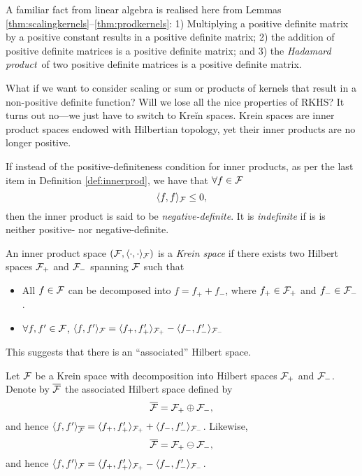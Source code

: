 A familiar fact from linear algebra is realised here from Lemmas \ref{thm:scalingkernels}--\ref{thm:prodkernels}: 
1) Multiplying a positive definite matrix by a positive constant results in a positive definite matrix; 
2) the addition of positive definite matrices is a positive definite matrix; and 
3) the \emph{Hadamard product}\footnotemark~of two positive definite matrices is a positive definite matrix.


What if we want to consider scaling or sum or products of kernels that result in a non-positive definite function?
Will we lose all the nice properties of RKHS?
It turns out no---we just have to switch to Kreĭn spaces.
Krein spaces are inner product spaces endowed with Hilbertian topology, yet their inner products are no longer positive.

\begin{definition}
  If instead of the positive-definiteness condition for inner products, as per the last item in Definition \ref{def:innerprod}, we have that $\forall f\in{\mathcal F}$
  \[
    \langle f,f\rangle_{\mathcal F} \leq 0,
  \]
  then the inner product is said to be \emph{negative-definite}.
  It is \emph{indefinite} if is is neither positive- nor negative-definite.
\end{definition}


\begin{definition}
  An inner product space $({\mathcal F},\langle\cdot,\cdot\rangle_{\mathcal F})$ is a \emph{Krein space} if there exists two Hilbert spaces ${\mathcal F}_+$ and ${\mathcal F}_-$ spanning ${\mathcal F}$ such that
  \begin{itemize}
    \item All $f\in{\mathcal F}$ can be decomposed into $f = f_+ + f_-$, where $f_+\in{\mathcal F}_+$ and $f_- \in {\mathcal F}_-$.
    \item $\forall f,f'\in{\mathcal F}$, $\langle f,f'\rangle_{\mathcal F} = \langle f_+,f_+'\rangle_{{\mathcal F}_+}- \langle f_-,f_-'\rangle_{{\mathcal F}_-}$
  \end{itemize}
\end{definition}

This suggests that there is an ``associated'' Hilbert space.

\begin{definition}
  Let ${\mathcal F}$ be a Krein space with decomposition into Hilbert spaces ${\mathcal F}_+$ and ${\mathcal F}_-$.
  Denote by $\overline {{\mathcal F}}$ the associated Hilbert space defined by
  \[
    \overline {{\mathcal F}} = {\mathcal F}_+ \oplus {\mathcal F}_-,
  \]
  and hence $\langle f,f'\rangle_{\overline{{\mathcal F}}} = \langle f_+,f_+'\rangle_{{\mathcal F}_+} + \langle f_-,f_-'\rangle_{{\mathcal F}_-}$.
  Likewise,
  \[
    \overline {{\mathcal F}} = {\mathcal F}_+ \ominus {\mathcal F}_-,
  \]
  and hence $\langle f,f'\rangle_{{\mathcal F}} = \langle f_+,f_+'\rangle_{{\mathcal F}_+} - \langle f_-,f_-'\rangle_{{\mathcal F}_-}$.
\end{definition}

